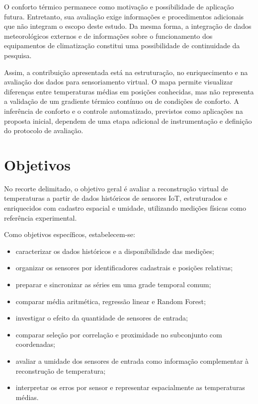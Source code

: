 O conforto térmico permanece como motivação e possibilidade de aplicação futura. Entretanto, sua avaliação exige informações e procedimentos adicionais que não integram o escopo deste estudo. Da mesma forma, a integração de dados meteorológicos externos e de informações sobre o funcionamento dos equipamentos de climatização constitui uma possibilidade de continuidade da pesquisa.

Assim, a contribuição apresentada está na estruturação, no enriquecimento
e na avaliação dos dados para sensoriamento virtual. O mapa permite
visualizar diferenças entre temperaturas médias em posições conhecidas,
mas não representa a validação de um gradiente térmico contínuo ou de
condições de conforto. A inferência de conforto e o controle automatizado,
previstos como aplicações na proposta inicial, dependem de uma etapa
adicional de instrumentação e definição do protocolo de avaliação.

\section{Objetivos}
No recorte delimitado, o objetivo geral é avaliar a reconstrução virtual
de temperaturas a partir de dados históricos de sensores IoT,
estruturados e enriquecidos com cadastro espacial e umidade,
utilizando medições físicas como referência experimental.

Como objetivos específicos, estabelecem-se:
\begin{itemize}
    \item caracterizar os dados históricos e a disponibilidade das medições;
    \item organizar os sensores por identificadores cadastrais e posições relativas;
    \item preparar e sincronizar as séries em uma grade temporal comum;
    \item comparar média aritmética, regressão linear e Random Forest;
    \item investigar o efeito da quantidade de sensores de entrada;
    \item comparar seleção por correlação e proximidade no subconjunto com coordenadas;
    \item avaliar a umidade dos sensores de entrada como informação complementar
    à reconstrução de temperatura;
    \item interpretar os erros por sensor e representar espacialmente as temperaturas médias.
\end{itemize}

